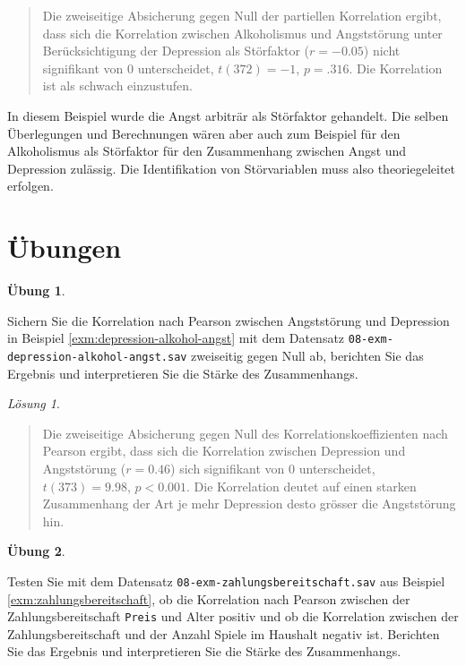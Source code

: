 \documentclass[
]{book}
\theoremstyle{definition}
\theoremstyle{definition}
\theoremstyle{definition}
\newtheorem{exercise}{Übung}[chapter]
\theoremstyle{definition}
\theoremstyle{remark}
\newtheorem*{solution}{Lösung}
\begin{document}
\begin{quote}
Die zweiseitige Absicherung gegen Null der partiellen Korrelation ergibt, dass sich die Korrelation zwischen Alkoholismus und Angststörung unter Berücksichtigung der Depression als Störfaktor (\(r = -0.05\)) nicht signifikant von \(0\) unterscheidet, \(t(372) = -1\), \(p = .316\). Die Korrelation ist als schwach einzustufen.
\end{quote}

In diesem Beispiel wurde die Angst arbiträr als Störfaktor gehandelt. Die selben Überlegungen und Berechnungen wären aber auch zum Beispiel für den Alkoholismus als Störfaktor für den Zusammenhang zwischen Angst und Depression zulässig. Die Identifikation von Störvariablen muss also theoriegeleitet erfolgen.

\section{Übungen}\label{uxfcbungen-5}

\begin{exercise}
\protect\hypertarget{exr:depression-alkohol-angst-berichten}{}\label{exr:depression-alkohol-angst-berichten}\leavevmode

Sichern Sie die Korrelation nach Pearson zwischen Angststörung und Depression in Beispiel \ref{exm:depression-alkohol-angst} mit dem Datensatz \texttt{08-exm-depression-alkohol-angst.sav} zweiseitig gegen Null ab, berichten Sie das Ergebnis und interpretieren Sie die Stärke des Zusammenhangs.

\end{exercise}

\begin{solution}
\leavevmode

\begin{quote}
Die zweiseitige Absicherung gegen Null des Korrelationskoeffizienten nach Pearson ergibt, dass sich die Korrelation zwischen Depression und Angststörung (\(r = 0.46\)) sich signifikant von \(0\) unterscheidet, \(t(373) = 9.98\), \(p < 0.001\). Die Korrelation deutet auf einen starken Zusammenhang der Art je mehr Depression desto grösser die Angststörung hin.
\end{quote}

\end{solution}

\begin{exercise}
\protect\hypertarget{exr:zahlungsbereitschaft-berichten}{}\label{exr:zahlungsbereitschaft-berichten}\leavevmode

Testen Sie mit dem Datensatz \texttt{08-exm-zahlungsbereitschaft.sav} aus Beispiel \ref{exm:zahlungsbereitschaft}, ob die Korrelation nach Pearson zwischen der Zahlungsbereitschaft \texttt{Preis} und Alter positiv und ob die Korrelation zwischen der Zahlungsbereitschaft und der Anzahl Spiele im Haushalt negativ ist. Berichten Sie das Ergebnis und interpretieren Sie die Stärke des Zusammenhangs.

\end{exercise}
\end{document}
